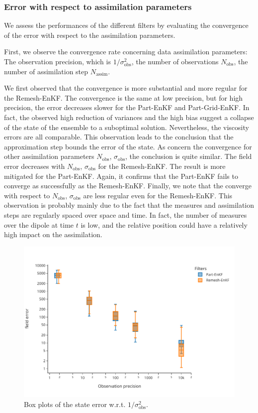 \subsubsection{Error with respect to assimilation parameters}
We assess the performances of the different filters by evaluating the convergence of the error with respect to the assimilation parameters.

First, we observe the convergence rate concerning data assimilation parameters: The observation precision, which is \(1/\sigma_{\text{obs}}^2\), the number of observations \(N_{\text{obs}}\), the number of assimilation step \(N_{\text{assim}}\).

We first observed that the convergence is more substantial and more regular for the Remesh-EnKF. The convergence is the same at low precision, but for high precision, the error decreases slower for the Part-EnKF and Part-Grid-EnKF. In fact, the observed high reduction of variances and the high bias suggest a collapse of the state of the ensemble to a suboptimal solution. Nevertheless, the viscosity errors are all comparable. This observation leads to the conclusion that the approximation step bounds the error of the state.
As concern the convergence for other assimilation parameters \(N_{\text{obs}}\), \(\sigma_{\text{obs}}\), the conclusion is quite similar. The field error decreases with \(N_{\text{obs}}\), \(\sigma_{\text{obs}}\) for the Remesh-EnKF. The result is more mitigated for the Part-EnKF. Again, it confirms that the Part-EnKF fails to converge as successfully as the Remesh-EnKF.
Finally, we note that the converge with respect to \(N_{\text{obs}}\), \(\sigma_{\text{obs}}\) are less regular even for the Remesh-EnKF. This observation is probably mainly due to the fact that the measures and assimilation steps are regularly spaced over space and time. In fact, the number of measures over the dipole at time $t$ is low, and the relative position could have a relatively high impact on the assimilation.

\begin{figure}[htbp]
	\captionsetup{labelformat=empty}
	\centering
	\includegraphics[width=0.6\linewidth]{./images/app2d/final/MSE_obs_precision_box.pdf}
	\caption{Box plots of the state error w.r.t. $1/\sigma_{\text{obs}}^2$.}
	\label{fig:obs_precision}
\end{figure}

